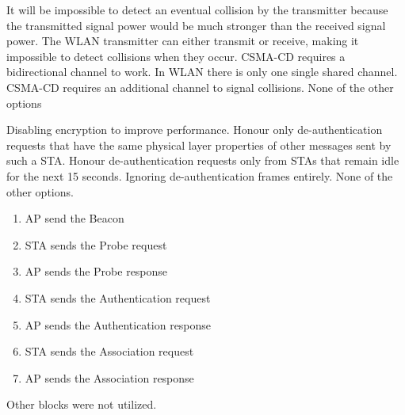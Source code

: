 \begin{questions}
    \begin{checkboxes}
        \CorrectChoice It will be impossible to detect an eventual collision by the transmitter because the transmitted signal power would be much stronger than the received signal power.
        \CorrectChoice The WLAN transmitter can either transmit or receive, making it impossible to detect collisions when they occur.
        \choice CSMA-CD requires a bidirectional channel to work. In WLAN there is only one single shared channel.
        \choice CSMA-CD requires an additional channel to signal collisions.
        \choice None of the other options
    \end{checkboxes}

    \begin{checkboxes}
        \choice Disabling encryption to improve performance.
        \CorrectChoice Honour only de-authentication requests that have the same physical layer properties of other messages sent by such a STA.
        \CorrectChoice Honour de-authentication requests only from STAs that remain idle for the next 15 seconds.
        \CorrectChoice Ignoring de-authentication frames entirely.
        \choice None of the other options.
    \end{checkboxes}

    \begin{solution}
        \begin{enumerate}
            \item AP send the Beacon
            \item STA sends the Probe request
            \item AP sends the Probe response
            \item STA sends the Authentication request
            \item AP sends the Authentication response
            \item STA sends the Association request
            \item AP sends the Association response
        \end{enumerate}
        Other blocks were not utilized.
    \end{solution}



\end{questions}

